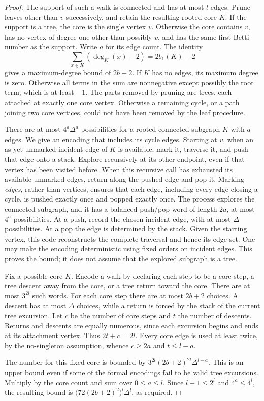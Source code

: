 \begin{proof}
The support of such a walk is connected and has at most \(l\)
edges.  Prune leaves other than \(v\) successively, and retain the
resulting rooted core \(K\).  If the support is a tree, the core
is the single vertex \(v\).  Otherwise the core contains \(v\),
has no vertex of degree one other than possibly \(v\), and has
the same first Betti number as the support.  Write \(a\) for its
edge count.  The identity
\[
 \sum_{x\in K}(\deg_K(x)-2)=2b_1(K)-2
\]
gives a maximum-degree bound of \(2b+2\). If \(K\) has no edges,
its maximum degree is zero. Otherwise all terms in the sum are
nonnegative except possibly the root term, which is at least \(-1\).
The parts removed by pruning are trees, each
attached at exactly one core vertex.  Otherwise a remaining cycle,
or a path joining two core vertices, could not have been removed
by the leaf procedure.

There are at most \(4^a\Delta^a\) possibilities for a rooted
connected subgraph \(K\) with \(a\) edges.  We give an encoding
that includes its cycle edges.  Starting at \(v\), when an as yet
unmarked incident edge of \(K\) is available, mark it, traverse it,
and push that edge onto a stack.  Explore recursively at its other
endpoint, even if that vertex has been visited before.  When this
recursive call has exhausted its available unmarked edges, return
along the pushed edge and pop it.  Marking \emph{edges}, rather
than vertices, ensures that each edge, including every edge closing
a cycle, is pushed exactly once and popped exactly once.  The
process explores the connected subgraph, and it has a balanced
push/pop word of length \(2a\), at most \(4^a\) possibilities.
At a push, record the chosen incident edge, with at most \(\Delta\)
possibilities.  At a pop the edge is determined by the stack.
Given the starting vertex, this code reconstructs the complete
traversal and hence its edge set.  One may make the encoding
deterministic using fixed orders on incident edges.  This proves
the bound; it does not assume that the explored subgraph is a
tree.

Fix a possible core \(K\).  Encode a walk by declaring each step
to be a core step, a tree descent away from the core, or a tree
return toward the core.  There are at most \(3^{2l}\) such words.
For each core step there are at most \(2b+2\) choices.  A descent
has at most \(\Delta\) choices, while a return is forced by the
stack of the current tree excursion.  Let \(c\) be the number of
core steps and \(t\) the number of descents.  Returns and descents
are equally numerous, since each excursion begins and ends at
its attachment vertex.  Thus \(2t+c=2l\).  Every core edge is
used at least twice, by the no-singleton assumption, whence
\(c\ge2a\) and \(t\le l-a\).

The number for this fixed core is bounded by
\(3^{2l}(2b+2)^{2l}\Delta^{l-a}\).  This is an upper bound even
if some of the formal encodings fail to be valid tree excursions.
Multiply by the core count and sum over \(0\le a\le l\).  Since
\(l+1\le2^l\) and \(4^a\le4^l\), the resulting bound is
\(\bigl(72(2b+2)^2\bigr)^l\Delta^l\), as required.
\end{proof}

